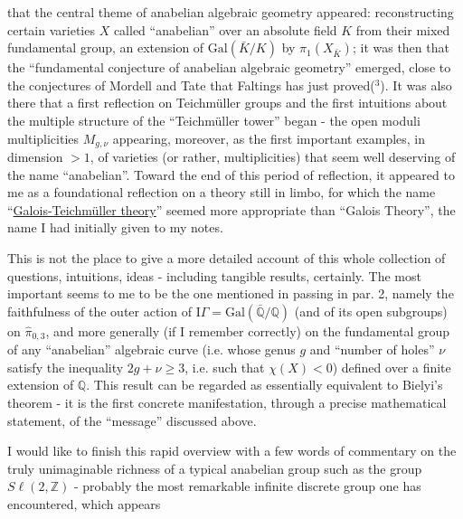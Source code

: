 
that the central theme of anabelian algebraic geometry appeared:
reconstructing certain varieties $X$ called ``anabelian''
over an absolute field $K$ from their mixed fundamental group,
an extension of $\mathrm{Gal}(\bar{K}/K)$ by $\pi_1(X_{\bar{K}})$; it was then that the
``fundamental conjecture of anabelian algebraic geometry'' emerged,
close to the conjectures of Mordell and Tate that Faltings
has just proved($^3$). It was also there that a first reflection on
Teichmüller groups and the first intuitions about the multiple
structure of the ``Teichmüller tower'' began - the open moduli
multiplicities $M_{g,\nu}$ appearing, moreover, as the first important
examples, in dimension $> 1$, of varieties (or rather,
multiplicities) that seem well deserving of the name ``anabelian''.
Toward the end of this period of reflection, it appeared to me
as a foundational reflection on a theory still in
limbo, for which the name ``\uline{Galois-Teichmüller theory}''
seemed more appropriate than ``Galois Theory'', the name I had initially
given to my notes.

This is not the place to give a more detailed account
of this whole collection of questions, intuitions, ideas - including
tangible results, certainly. The most important seems to me to be the one
mentioned in passing in par. 2, namely the faithfulness of the outer
action of $\mathrm{I}\!\Gamma = \mathrm{Gal}(\bar{\mathbb{Q}}/\mathbb{Q})$ (and of its open subgroups) on $\hat{\pi}_{0,3}$,
and more generally (if I remember correctly) on the fundamental
group of any ``anabelian'' algebraic curve (i.e. whose genus
$g$ and ``number of holes'' $\nu$ satisfy the inequality $2g + \nu \geq 3$,
i.e. such that $\chi(X) < 0$) defined over a finite extension of $\mathbb{Q}$. This
result can be regarded as essentially equivalent to
Bielyi's theorem - it is the first concrete manifestation, through
a precise mathematical statement, of the ``message'' discussed
above.

I would like to finish this rapid overview with a few words
of commentary on the truly unimaginable richness of a typical
anabelian group such as the group $S\ell(2,\mathbb{Z})$ - probably the most
remarkable infinite discrete group one has encountered, which appears


